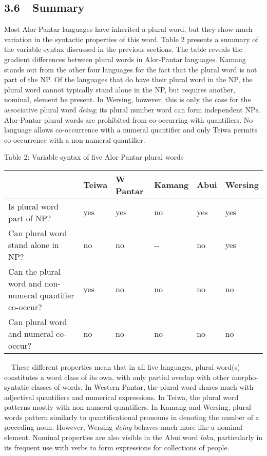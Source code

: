 \subsection[3.6\ \ Summary ]{3.6\ \ Summary }
Most Alor-Pantar languages have inherited a plural word, but they show much variation in the syntactic properties of this word. Table 2 presents a summary of the variable syntax discussed in the previous sections. The table reveals the gradient differences between plural words in Alor-Pantar languages. Kamang stands out from the other four languages for the fact that the plural word is not part of the NP. Of the languages that do have their plural word in the NP, the plural word cannot typically stand alone in the NP, but requires another, nominal, element be present. In Wersing, however, this is only the case for the associative plural word \textit{deing}; its plural number word can form independent NPs. Alor-Pantar plural words are prohibited from co-occurring with quantifiers. No language allows co-occurrence with a numeral quantifier and only Teiwa permits co-occurrence with a non-numeral quantifier.

{\centering
Table 2: Variable syntax of five Alor-Pantar plural words
\par}

\begin{flushleft}
\tablehead{}
\begin{supertabular}{|m{2.75116in}|m{0.51155984in}|m{0.8080598in}|m{0.70805985in}|m{0.42335984in}|m{0.70045984in}|}
\hline
 &
\bfseries Teiwa  &
\bfseries W Pantar &
\bfseries Kamang  &
\bfseries Abui  &
\bfseries Wersing\\\hline
Is plural word part of NP? &
yes &
yes &
no &
yes &
yes\\\hline
Can plural word stand alone in NP? &
no &
no &
{}-{}- &
no &
yes\\\hline
Can the plural word and non-numeral quantifier co-occur? &
yes &
no &
no &
no &
no\\\hline
Can plural word and numeral co-occur? &
no  &
no &
no &
no  &
no\\\hline
\end{supertabular}
\end{flushleft}
\ \ These different properties mean that in all five languages, plural word(s) constitutes a word class of its own, with only partial overlap with other morpho-syntatic classes of words. In Western Pantar, the plural word shares much with adjectival quantifiers and numerical expressions. In Teiwa, the plural word patterns mostly with non-numeral quantifiers. In Kamang and Wersing, plural words pattern similarly to quantificational pronouns in denoting the number of a preceding noun. However, Wersing \textit{deing} behaves much more like a nominal element. Nominal properties are also visible in the Abui word \textit{loku}, particularly in its frequent use with verbs to form expressions for collections of people.

